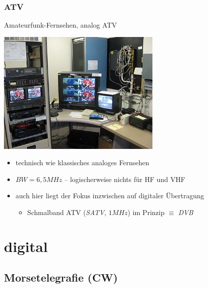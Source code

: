 \begin{frame}
    \frametitle{ATV}

    Amateurfunk-Fernsehen, analog ATV

    \begin{center}
        \includegraphics[width=0.6\textwidth,height=.45\textheight,keepaspectratio]{e16/SVECS-atv16.jpg}
        \tiny \hyperlink{refs}{\cite{atv}}
    \end{center}

    \begin{itemize}
        \item technisch wie klassisches analoges Fernsehen
        \item $BW = 6,5 MHz$ -- logischerweise nichts für HF und VHF
        \item auch hier liegt der Fokus inzwischen auf digitaler Übertragung
        \begin{itemize}
            \item Schmalband ATV (\emph{SATV}, $1 MHz$) im Prinzip $\equiv$ \emph{DVB}
        \end{itemize}
    \end{itemize}

\end{frame}

\section{digital}

\subsection[CW]{Morsetelegrafie (CW)}

